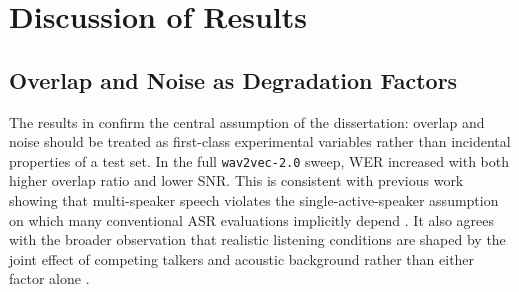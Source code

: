 
\section{Discussion of Results}
\subsection{Overlap and Noise as Degradation Factors}
The results in  confirm the central assumption of the dissertation: overlap and noise should be treated as first-class experimental variables rather than incidental properties of a test set. In the full \texttt{wav2vec-2.0} sweep, WER increased with both higher overlap ratio and lower SNR. This is consistent with previous work showing that multi-speaker speech violates the single-active-speaker assumption on which many conventional ASR evaluations implicitly depend \citep{galibert2013methodologies, chen2020continuousspeechseparationdataset, von_Neumann_2023}. It also agrees with the broader observation that realistic listening conditions are shaped by the joint effect of competing talkers and acoustic background rather than either factor alone \citep{Conversation_in_small_groups, wu2018characteristics}.

